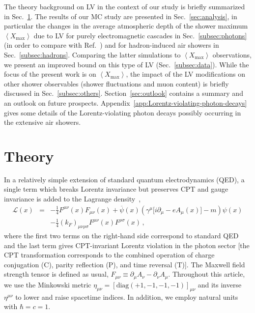 \documentclass[aps,prd,preprint,longbibliography]{revtex4-1}
\begin{document}
The theory background on LV
in the context of our study is briefly summarized in
Sec.~\ref{sec:theory}. The results of our MC study are presented in
Sec.~\ref{sec:analysis}, in particular the changes in the average
atmospheric depth of the shower maximum $\left<X_\text{max}\right>$ due to LV for purely electromagnetic cascades in Sec.~\ref{subsec:photons}
(in order to compare with Ref.~\cite{DiazKlinkhamerRisse2016})
and for hadron-induced air showers in Sec.~\ref{subsec:hadrons}.
Comparing the latter simulations to $\left<X_\text{max}\right>$ observations, we present an improved bound on this type of LV (Sec.~\ref{subsec:data}).
While the focus of the present work is on $\left<X_\text{max}\right>$,
the impact of the LV modifications on other shower observables
(shower fluctuations and muon content) is briefly
discussed in Sec.~\ref{subsec:others}.
Section~\ref{sec:outlook} contains a summary and an outlook
on future prospects.
Appendix~\ref{app:Lorentz-violating-photon-decays}
gives some details of the Lorentz-violating photon decays
possibly occurring in the extensive air showers.

\section{Theory}
\label{sec:theory}

In a relatively simple extension of standard quantum electrodynamics
(QED), a single term which breaks
Lorentz invariance but preserves CPT and gauge invariance is added to
the Lagrange density~\cite{ChadhaNielsen1983,KosteleckyMewes2002},
\begin{eqnarray}\label{eq:lagrange-dens}
\mathcal{L}(x)&=&
-\frac{1}{4}F^{\mu\nu}(x)F_{\mu\nu}(x) +
\overline{\psi}(x)\left(\gamma^\mu\big[i\partial_\mu-eA_\mu(x)\big]
-m\right)\psi(x)
\nonumber\\[1mm]&&
-\frac{1}{4}(k_F)_{\mu\nu\rho\sigma}F^{\mu\nu}(x)F^{\rho\sigma}(x)\,,
\end{eqnarray}
where the first two terms on the right-hand side correspond to standard
QED and the last term gives CPT-invariant Lorentz violation
in the photon sector
[the CPT transformation corresponds to the
combined operation of charge conjugation (C), parity reflection (P),
and time reversal (T)].
The Maxwell field strength tensor is defined as usual,
$F_{\mu\nu} \equiv \partial_\mu A_\nu - \partial_\nu A_\mu$.
Throughout this article, we use the Minkowski metric
$\eta_{\mu\nu} =[\text{diag}(+1,-1,-1,-1)]_{\mu\nu}$
and its inverse $\eta^{\mu\nu}$ to lower and raise spacetime indices.
In addition, we employ natural units with $\hbar =  c = 1$.
\end{document}
